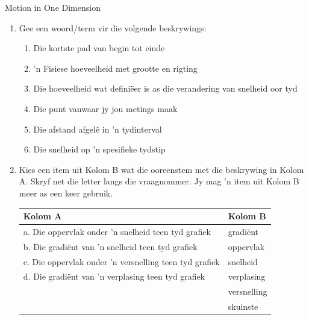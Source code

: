 \begin{eocexercises}{Motion in One Dimension}
\nopagebreak \noindent
    \begin{enumerate}[noitemsep, label=\textbf{\arabic*}. ] 
    \item Gee een woord/term vir die volgende beskrywings:
    \begin{enumerate}[noitemsep, label=\textbf{\alph*}. ] 
        \item Die kortste pad van begin tot einde
        \item  'n Fisiese hoeveelheid met grootte en rigting
        \item Die hoeveelheid wat defini\"eer is as die verandering van snelheid oor tyd
        \item Die punt vanwaar jy jou metings maak
        \item Die afstand afgel\^e in  'n tydinterval
        \item Die snelheid op  'n spesifieke tydstip
    \end{enumerate}
    \item Kies een item uit Kolom B wat die ooreenstem met die beskrywing in Kolom A. Skryf net die letter langs die vraagnommer. Jy mag  'n item uit Kolom B meer as een keer gebruik.
              \begin{table}[H]
            \begin{center}
          \label{m38796*uid180}
        \noindent
          \begin{tabular}{|l|l|}\hline
            Kolom A &
            Kolom B \\ \hline
            a. Die oppervlak onder  'n snelheid teen tyd grafiek &
            gradi\"ent \\ \hline
            b. Die gradi\"ent van  'n snelheid teen tyd grafiek &
            oppervlak\\ \hline
            c. Die oppervlak onder  'n versnelling teen tyd grafiek &
            snelheid\\ \hline
            d. Die gradi\"ent van  'n verplasing teen tyd grafiek &
            verplasing \\ \hline
             &
            versnelling\\ \hline
             &
            skuinste \\ \hline
        \end{tabular}
          \end{center}
    \end{table}
        \par
    

\end{enumerate}
\end{eocexercises}
